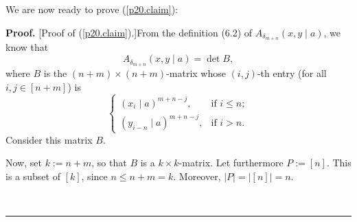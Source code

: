\documentclass[numbers=enddot,12pt,final,onecolumn,notitlepage]{scrartcl}%
\theoremstyle{definition}
\newenvironment{proof}[1][Proof]{\noindent\textbf{#1.} }{\ \rule{0.5em}{0.5em}}
\begin{document}
\begin{enumerate}
We are now ready to prove (\ref{p20.claim}):

\begin{proof}
[Proof of (\ref{p20.claim}).]From the definition (6.2) of $A_{\delta_{m+n}%
}\left(  x,y\mid a\right)  $, we know that
\begin{equation}
A_{\delta_{m+n}}\left(  x,y\mid a\right)  =\det B, \label{p20.claim.pf.1}%
\end{equation}
where $B$ is the $\left(  n+m\right)  \times\left(  n+m\right)  $-matrix whose
$\left(  i,j\right)  $-th entry (for all $i,j\in\left[  n+m\right]  $) is%
\[%
\begin{cases}
\left(  x_{i}\mid a\right)  ^{m+n-j}, & \text{if }i\leq n;\\
\left(  y_{i-n}\mid a\right)  ^{m+n-j}, & \text{if }i>n.
\end{cases}
\]
Consider this matrix $B$.

Now, set $k:=n+m$, so that $B$ is a $k\times k$-matrix. Let furthermore
$P:=\left[  n\right]  $. This is a subset of $\left[  k\right]  $, since
$n\leq n+m=k$. Moreover, $\left\vert P\right\vert =\left\vert \left[
n\right]  \right\vert =n$.


\end{proof}
\end{enumerate}
\end{document}
